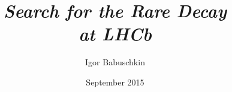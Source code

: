 \documentclass[
  BCOR=12mm,
  parskip=half,
  open=any,
]{tudothesis}
\author{Igor Babuschkin}
\title{\textit{Search for the Rare Decay\\ \bolddecay{} at LHCb}}
\date{September 2015}
\begin{document}
\frontmatter
\maketitle

\makecorrectorpage


\tableofcontents

\mainmatter


%

\backmatter
\printbibliography

\cleardoublepage

\end{document}
